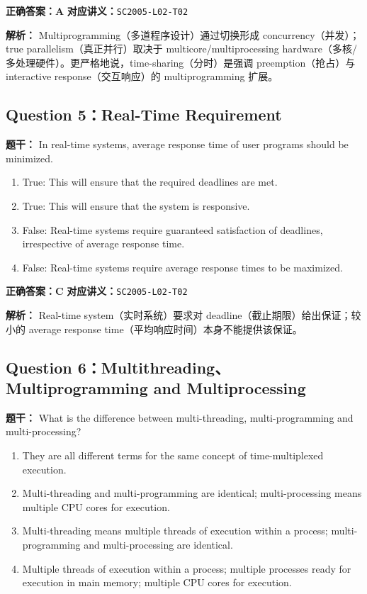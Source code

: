 \documentclass[11pt,a4paper,fontset=fandol]{ctexart}
\renewcommand{\exercisequestion}[2]{%
  \Needspace{5\baselineskip}%
  \subsection{#2}\label{exercise:#1}%
}
\renewenvironment{checkedsolution}
  {\par\nopagebreak[4]\textbf{解析：}\ignorespaces}
  {\par}
\begin{document}
\textbf{正确答案：A}\qquad
\textbf{对应讲义：}\texttt{SC2005-L02-T02}

\begin{checkedsolution}
Multiprogramming（多道程序设计）通过切换形成 concurrency（并发）；true parallelism（真正并行）取决于 multicore/multiprocessing hardware（多核/多处理硬件）。更严格地说，time-sharing（分时）是强调 preemption（抢占）与 interactive response（交互响应）的 multiprogramming 扩展。
\end{checkedsolution}

\exercisequestion{SC2005-HW01-Q05}{Question 5：Real-Time Requirement}

\textbf{题干：} In real-time systems, average response time of user programs should be minimized.

\begin{enumerate}[label=\Alph*.,leftmargin=2.4em]
  \item True: This will ensure that the required deadlines are met.
  \item True: This will ensure that the system is responsive.
  \item False: Real-time systems require guaranteed satisfaction of deadlines, irrespective of average response time.
  \item False: Real-time systems require average response times to be maximized.
\end{enumerate}

\textbf{正确答案：C}\qquad
\textbf{对应讲义：}\texttt{SC2005-L02-T02}

\begin{checkedsolution}
Real-time system（实时系统）要求对 deadline（截止期限）给出保证；较小的 average response time（平均响应时间）本身不能提供该保证。
\end{checkedsolution}

\exercisequestion{SC2005-HW01-Q06}{Question 6：Multithreading、Multiprogramming and Multiprocessing}

\textbf{题干：} What is the difference between multi-threading, multi-programming and multi-processing?

\begin{enumerate}[label=\Alph*.,leftmargin=2.4em]
  \item They are all different terms for the same concept of time-multiplexed execution.
  \item Multi-threading and multi-programming are identical; multi-processing means multiple CPU cores for execution.
  \item Multi-threading means multiple threads of execution within a process; multi-programming and multi-processing are identical.
  \item Multiple threads of execution within a process; multiple processes ready for execution in main memory; multiple CPU cores for execution.
\end{enumerate}
\end{document}
